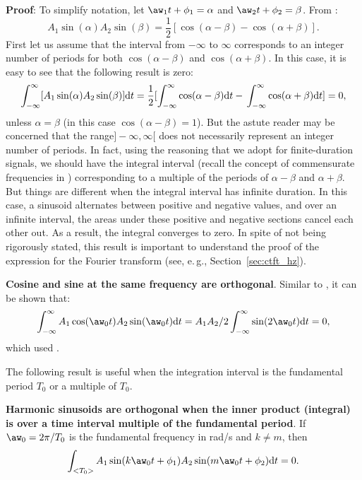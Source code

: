 \textbf{Proof}: 
To simplify notation, let $\aw_1 t + \phi_1 = \alpha$ and $\aw_2 t + \phi_2 = \beta$. From :
\[
A_1 \sin (\alpha) A_2 \sin (\beta) = \frac{1}{2}[\cos (\alpha-\beta) - \cos(\alpha+\beta)].
\]
First let us assume that the interval from $-\infty$ to $\infty$ corresponds to an integer number of periods
for both $\cos (\alpha-\beta)$ and  $\cos(\alpha+\beta)$. In this case, it is easy to see that the following result is zero:
\[
\int_{-\infty}^\infty [A_1 \sin (\alpha) A_2 \sin (\beta)] \textrm{d}t = \frac{1}{2}[\int_{-\infty}^\infty \cos (\alpha-\beta) \textrm{d}t -  \\ \int_{-\infty}^\infty \cos(\alpha+\beta) \textrm{d}t] = 0,
\]
unless $\alpha=\beta$ (in this case $\cos (\alpha-\beta)=1$).
But the astute reader may be concerned that the range$]-\infty,\infty[$ does not necessarily represent an integer number of periods. In fact, using the 
reasoning that we adopt for finite-duration signals, we should have the integral interval (recall the concept of
commensurate frequencies in ) corresponding to a multiple
of the periods of $\alpha-\beta$ and $\alpha+\beta$. But things are different when the integral interval has infinite duration.
In this case, a sinusoid alternates between positive and negative values, and over an infinite interval, the areas under these positive and negative sections cancel each other out. As a result, the integral converges to zero.
In spite of not being rigorously stated, this result is important to understand the proof of the expression for the Fourier transform (see, e.\,g., Section~\ref{sec:ctft_hz}).
\eResult

\bResult \label{ex:cos_sin_orthogonality} \textbf{Cosine and sine at the same frequency are orthogonal}. Similar to , it can be shown that:
\[
\int_{-\infty}^\infty A_1 \cos (\aw_0 t ) A_2 \sin (\aw_0 t) \textrm{d}t = A_1 A_2 / 2 \int_{-\infty}^\infty  \sin (2 \aw_0 t) \textrm{d}t = 0,
\]
which used .
\eResult 

The following result is useful when the integration interval is the fundamental period $T_0$ or a multiple of $T_0$.

\bResult \label{ex:harmonic_sinusoids} \textbf{Harmonic sinusoids are orthogonal when the inner product (integral) is over a time interval multiple of the fundamental period}. If $\aw_0 = 2 \pi/ T_0$ is the fundamental frequency in rad/s and $k \ne m$, then 
\[
\int_{<T_0>} A_1 \sin (k \aw_0 t + \phi_1) A_2 \sin (m \aw_0 t + \phi_2) \textrm{d}t = 0.
\] %

